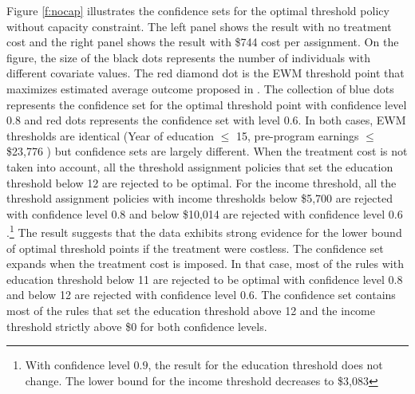 \documentclass[12pt,oneside,reqno,english]{amsart}
\theoremstyle{definition}
\begin{document}
Figure \ref{f:nocap} illustrates the confidence sets for the optimal threshold policy without capacity constraint. 
The left panel shows the result with no treatment cost and the right panel shows the result with \$744 cost per assignment. On the figure, the size of the black dots represents the number of individuals with different covariate values. The red diamond dot is the EWM threshold point that maximizes estimated average outcome proposed in \cite{KT:18}. The collection of blue dots represents the confidence set for the optimal threshold point with confidence level $0.8$ and red dots represents the confidence set with level $0.6$. In both cases, EWM thresholds are identical (Year of education $\leq$ 15, pre-program earnings $\leq$ \$23,776 ) but confidence sets are largely different. When the treatment cost is not taken into account, all the threshold assignment policies that set the education threshold below 12 are rejected to be optimal. For the income threshold, all the threshold assignment policies with income thresholds below \$5,700 are rejected with confidence level $0.8$ and below \$10,014 are rejected with confidence level $0.6$.\footnote{With confidence level $0.9$, the result for the education threshold does not change. The lower bound for the income threshold decreases to \$3,083} 
The result suggests that the data exhibits strong evidence for the lower bound of optimal threshold points if the treatment were costless. The confidence set expands when the treatment cost is imposed. In that case, most of the rules with education threshold below 11 are rejected to be optimal with confidence level $0.8$ and below 12 are rejected with confidence level $0.6$.  
The confidence set contains most of the rules that set the education threshold above 12 and the income threshold strictly above \$0 for both confidence levels. 
\end{document}
